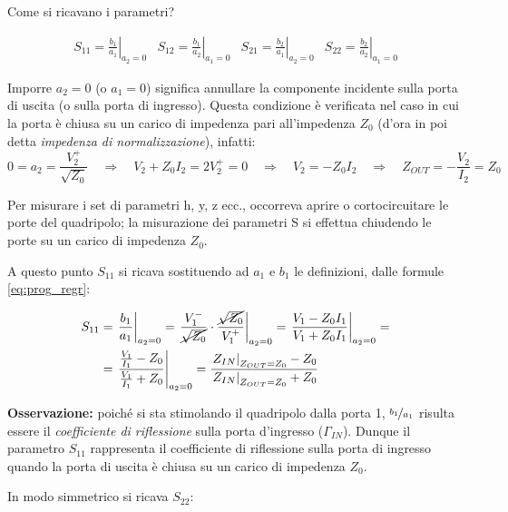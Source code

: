 Come si ricavano i parametri?

\[
\begin{array}{cccc}
S_{11} = \left. \frac{b_1}{a_1} \right|_{a_2 = 0}
&
S_{12} = \left. \frac{b_1}{a_2} \right|_{a_1 = 0}
&
S_{21} = \left. \frac{b_2}{a_1} \right|_{a_2 = 0}
&
S_{22} = \left. \frac{b_2}{a_2} \right|_{a_1 = 0}
\end{array}
\]


Imporre $a_2 = 0$ (o $a_1 = 0$) significa annullare la componente incidente sulla porta di uscita (o sulla porta di ingresso). Questa condizione è verificata nel caso in cui la porta è chiusa su un carico di impedenza pari all'impedenza $Z_0$ (d'ora in poi detta \textit{impedenza di normalizzazione}), infatti:
$$0 = a_2 = \frac{V_2^+}{\sqrt{Z_0}}
\quad \Rightarrow \quad
V_2 + Z_0 I_2 = 2V_2^+ = 0
\quad \Rightarrow \quad
V_2 = -Z_0 I_2
\quad \Rightarrow \quad
Z_{OUT} = - \frac{V_2}{I_2} = Z_0
$$

Per misurare i set di parametri h, y, z ecc., occorreva aprire o cortocircuitare le porte del quadripolo; la misurazione dei parametri S si effettua chiudendo le porte su un carico di impedenza $Z_0$.

A questo punto $S_{11}$ si ricava sostituendo ad $a_1$ e $b_1$ le definizioni, dalle formule \ref{eq:prog_regr}:

\begin{align*}
S_{11} &= \left. \frac{b_1}{a_1} \right|_{a_2=0} =
\left. \frac{V_1^-}{\cancel{\sqrt{Z_0}}} \cdot
\frac{\cancel{\sqrt{Z_0}}}{V_1^+} \right|_{a_2=0} 
=
\left.
\frac{V_1 - Z_0 I_1}{V_1 + Z_0 I_1}
\right|_{a_2=0}
=\\
&=
\left.
\frac{\frac{V_1}{I_1} - Z_0}{\frac{V_1}{I_1} + Z_0}
\right|_{a_2=0}
=
\frac{\left.Z_{IN}\right|_{Z_{OUT}=Z_0} - Z_0}
{\left.Z_{IN}\right|_{Z_{OUT}=Z_0} + Z_0} 
\end{align*}

\textbf{Osservazione:} poiché si sta stimolando il quadripolo dalla porta 1, $\nicefrac{b_1}{a_1}$ risulta essere il \textit{coefficiente di riflessione} sulla porta d'ingresso ($\Gamma_{IN}$). Dunque il parametro $S_{11}$ rappresenta il coefficiente di riflessione sulla porta di ingresso quando la porta di uscita è chiusa su un carico di impedenza $Z_0$.

In modo simmetrico si ricava $S_{22}$:

